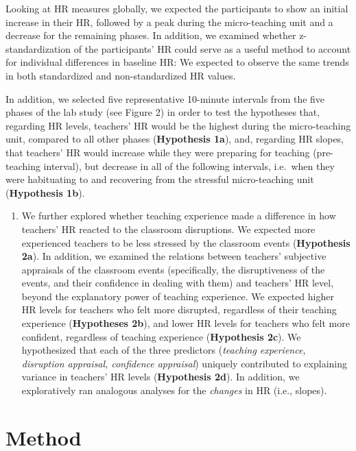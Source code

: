 \documentclass[preprint, 3p,
sort,]{elsarticle} %
\providecommand{\tightlist}{%
  \setlength{\itemsep}{0pt}\setlength{\parskip}{0pt}}
\begin{document}
Looking at HR measures globally, we expected the participants to show an
initial increase in their HR, followed by a peak during the
micro-teaching unit and a decrease for the remaining phases. In
addition, we examined whether z-standardization of the participants' HR
could serve as a useful method to account for individual differences in
baseline HR: We expected to observe the same trends in both standardized
and non-standardized HR values.

In addition, we selected five representative 10-minute intervals from
the five phases of the lab study (see Figure 2) in order to test the
hypotheses that, regarding HR levels, teachers' HR would be the highest
during the micro-teaching unit, compared to all other phases
(\textbf{Hypothesis 1a}), and, regarding HR slopes, that teachers' HR
would increase while they were preparing for teaching (pre-teaching
interval), but decrease in all of the following intervals, i.e.~when
they were habituating to and recovering from the stressful
micro-teaching unit (\textbf{Hypothesis 1b}).

\begin{enumerate}
\def\labelenumi{(\arabic{enumi})}
\setcounter{enumi}{1}
\tightlist
\item
  We further explored whether teaching experience made a difference in
  how teachers' HR reacted to the classroom disruptions. We expected
  more experienced teachers to be less stressed by the classroom events
  (\textbf{Hypothesis 2a}). In addition, we examined the relations
  between teachers' subjective appraisals of the classroom events
  (specifically, the disruptiveness of the events, and their confidence
  in dealing with them) and teachers' HR level, beyond the explanatory
  power of teaching experience. We expected higher HR levels for
  teachers who felt more disrupted, regardless of their teaching
  experience (\textbf{Hypotheses 2b}), and lower HR levels for teachers
  who felt more confident, regardless of teaching experience
  (\textbf{Hypothesis 2c}). We hypothesized that each of the three
  predictors (\emph{teaching experience, disruption appraisal,
  confidence appraisal}) uniquely contributed to explaining variance in
  teachers' HR levels (\textbf{Hypothesis 2d}). In addition, we
  exploratively ran analogous analyses for the \emph{changes} in HR
  (i.e., slopes).
\end{enumerate}

\section{Method}\label{method}
\end{document}
